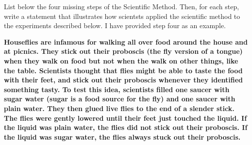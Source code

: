 \question[7]
List below the four missing steps of the Scientific Method. Then,
for each step, write a statement that illustrates how scientsts applied
the scientific method to the experiments described below. I have
provided step four as an example.

\textbf{Houseflies are infamous for walking all over food around the house
and at picnics. They stick out their proboscis (the fly version of a tongue)
when they walk on food but not when the walk on other things, like the table.
Scientists thought that flies might be able to taste the food with their feet,
and stick out their proboscis whenever they identified something tasty. To
test this idea, scientists filled one saucer with sugar water (sugar is a food
source for the fly) and one saucer with plain water. They then glued live 
flies to the end of a slender stick. The flies were gently lowered until their 
feet just touched the liquid. If the liquid was plain water, the flies did not stick
out their proboscis. If the liquid was sugar water, the flies always stuck out 
their proboscis.}




\newpage
